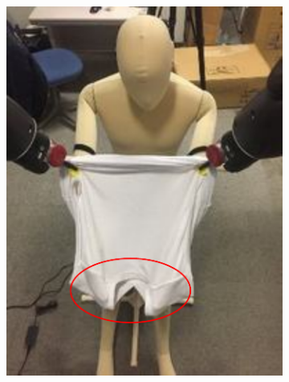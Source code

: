 \documentclass[sigconf]{acmart}
\begin{document}
\begin{figure}
	\centering
	\begin{subfigure}{.4\linewidth}
		\includegraphics[width=.98\linewidth]{failure_scenario_1}
	\end{subfigure}%
	\begin{subfigure}{.4\linewidth}

\end{subfigure}
\end{figure}
\end{document}
